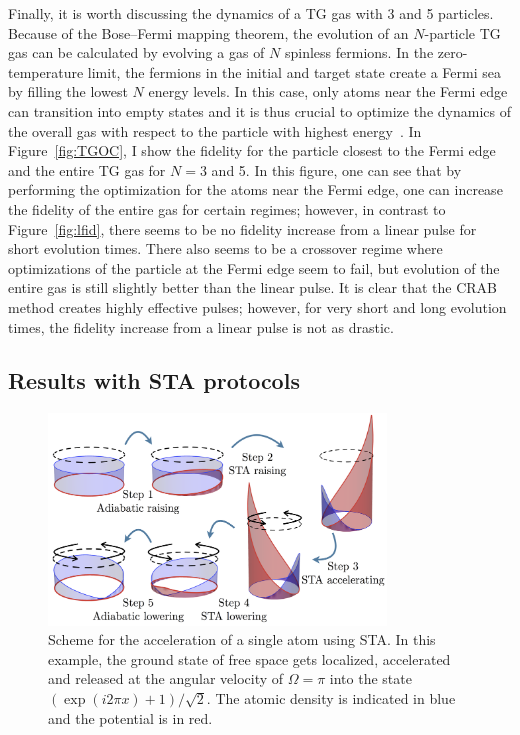 Finally, it is worth discussing the dynamics of a TG gas with 3 and 5 particles.
Because of the Bose--Fermi mapping theorem, the evolution of an $N$-particle TG gas can be calculated by evolving a gas of $N$ spinless fermions.
In the zero-temperature limit, the fermions in the initial and target state create a Fermi sea by filling the lowest $N$ energy levels.
In this case, only atoms near the Fermi edge can transition into empty states and it is thus crucial to optimize the dynamics of the overall gas with respect to the particle with highest energy~\cite{garaot2015}.
In Figure~\ref{fig:TGOC}, I show the fidelity for the particle closest to the Fermi edge and the entire TG gas for $N=3$ and 5.
In this figure, one can see that by performing the optimization for the atoms near the Fermi edge, one can increase the fidelity of the entire gas for certain regimes; however, in contrast to Figure~\ref{fig:lfid}, there seems to be no fidelity increase from a linear pulse for short evolution times.
There also seems to be a crossover regime where optimizations of the particle at the Fermi edge seem to fail, but evolution of the entire gas is still slightly better than the linear pulse.
It is clear that the CRAB method creates highly effective pulses; however, for very short and long evolution times, the fidelity increase from a linear pulse is not as drastic.

\subsection{Results with STA protocols}

\begin{figure}
\centering
\includegraphics[width=0.8\textwidth]{data/1d/STAscheme.png} 
\caption{Scheme for the acceleration of a single atom using STA.
 In this example, the ground state of free space gets localized, accelerated and released at the angular velocity of $\Omega=\pi$ into the state
 $\left( \exp(i 2\pi x) +1 \right) /\sqrt 2$.
 The atomic density is indicated in blue and the potential is in red.}
\label{fig:STA-scheme}
\end{figure}


